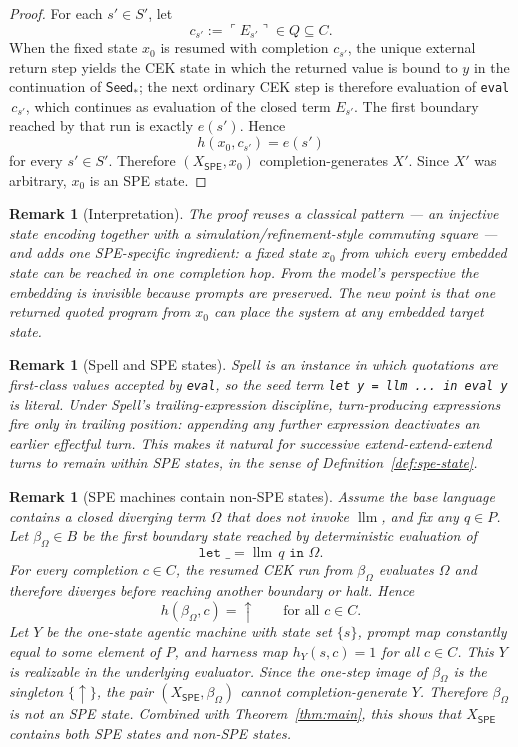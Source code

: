 \documentclass[11pt]{article}
\newtheorem{remark}[definition]{Remark}
\newcommand{\SPE}{\mathsf{SPE}}
\newcommand{\llm}{\operatorname{llm}}
\begin{document}
\begin{proof}
For each $s'\in S'$, let
\[
c_{s'}:=\ulcorner E_{s'}\urcorner\in Q\subseteq C.
\]
When the fixed state $x_0$ is resumed with completion $c_{s'}$, the unique external return step yields the CEK state in which the returned value is bound to $y$ in the continuation of $\mathsf{Seed}_{\ast}$; the next ordinary CEK step is therefore evaluation of \texttt{eval} $\,c_{s'}$, which continues as evaluation of the closed term $E_{s'}$. The first boundary reached by that run is exactly $e(s')$. Hence
\[
h(x_0,c_{s'})=e(s')
\]
for every $s'\in S'$. Therefore $(X_{\SPE},x_0)$ completion-generates $X'$. Since $X'$ was arbitrary, $x_0$ is an SPE state.
\end{proof}

\begin{remark}[Interpretation]\label{rem:interpretation}
The proof reuses a classical pattern --- an injective state encoding together with a simulation/refinement-style commuting square \cite{AbadiLamport91,LynchVaandrager95,SegalaLynch95} --- and adds one SPE-specific ingredient: a fixed state $x_0$ from which every embedded state can be reached in one completion hop. From the model's perspective the embedding is invisible because prompts are preserved. The new point is that one returned quoted program from $x_0$ can place the system at any embedded target state.
\end{remark}

\begin{remark}[Spell and SPE states]\label{rem:spell}
Spell is an instance in which quotations are first-class values accepted by \texttt{eval}, so the seed term \texttt{let y = llm ... in eval y} is literal. Under Spell's trailing-expression discipline, turn-producing expressions fire only in trailing position: appending any further expression deactivates an earlier effectful turn. This makes it natural for successive extend-extend-extend turns to remain within SPE states, in the sense of Definition~\ref{def:spe-state}.
\end{remark}

\begin{remark}[SPE machines contain non-SPE states]\label{rem:nonspe}
Assume the base language contains a closed diverging term $\Omega$ that does not invoke $\llm$, and fix any $q\in P$. Let $\beta_{\Omega}\in B$ be the first boundary state reached by deterministic evaluation of
\[
\texttt{let } \_ = \llm\, q \texttt{ in } \Omega.
\]
For every completion $c\in C$, the resumed CEK run from $\beta_{\Omega}$ evaluates $\Omega$ and therefore diverges before reaching another boundary or halt. Hence
\[
h(\beta_{\Omega},c)=\uparrow
\qquad\text{for all }c\in C.
\]
Let $Y$ be the one-state agentic machine with state set $\{s\}$, prompt map constantly equal to some element of $P$, and harness map $h_Y(s,c)=1$ for all $c\in C$. This $Y$ is realizable in the underlying evaluator. Since the one-step image of $\beta_{\Omega}$ is the singleton $\{\uparrow\}$, the pair $(X_{\SPE},\beta_{\Omega})$ cannot completion-generate $Y$. Therefore $\beta_{\Omega}$ is not an SPE state. Combined with Theorem~\ref{thm:main}, this shows that $X_{\SPE}$ contains both SPE states and non-SPE states.
\end{remark}
\end{document}
